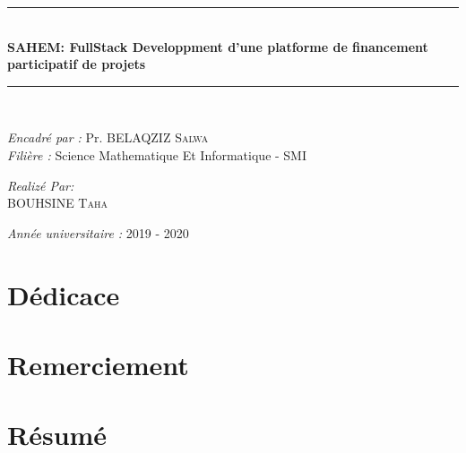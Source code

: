 \documentclass[11pt, openany]{report}
\newcommand{\HRule}{\rule{\linewidth}{0.5mm}}
\begin{document}
\begin{titlepage}
\begin{sffamily}
\begin{center}
    \HRule \\[0.4cm]
    { \huge \bfseries  SAHEM: FullStack Developpment d'une platforme de financement participatif de projets \\[0.4cm] }

    \HRule \\[2cm]
    \begin{minipage}{0.6\textwidth}
      \begin{flushleft} \large
        \emph{Encadré par : } Pr. \textsc{BELAQZIZ Salwa}\\
        \emph{Filière : } Science Mathematique Et Informatique - SMI \\
        
      \end{flushleft}
    \end{minipage}
    \newline \vskip1.5cm
    \begin{minipage}{0.5\textwidth}
      \begin{center} \large
        \emph{Realizé Par:} \\
                            \textsc{BOUHSINE Taha}\\
                         
      \end{center}
    \end{minipage}
    \vskip1.5cm
    \vfill

    {\large \emph{Année universitaire : } 2019 - 2020}

  \end{center}
  \end{sffamily}
  \thispagestyle{empty}
\end{titlepage}


\clearpage

\renewcommand{\baselinestretch}{1.18}\small \normalsize

\chapter*{Dédicace}

\chapter*{Remerciement}

\chapter*{Résumé }
\end{document}
